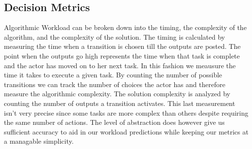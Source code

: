 \subsection{Decision Metrics}
Algorithmic Workload can be broken down into the timing, the complexity of the algorithm, and the complexity of the solution. The timing is calculated by measuring the time when a transition is chosen till the outputs are posted. The point when the outputs go high represents the time when that task is complete and the actor has moved on to her next task. In this fashion we meausure the time it takes to execute a given task. By counting the number of possible transitions we can track the number of choices the actor has and therefore measure the algorithmic complexity. The solution complexity is analyzed by counting the number of outputs a transition activates. This last measurement isn't very precise since some tasks are more complex than others despite requiring the same number of actions. The level of abstraction does however give us sufficient accuracy to aid in our workload predictions while keeping our metrics at a managable simplicity.